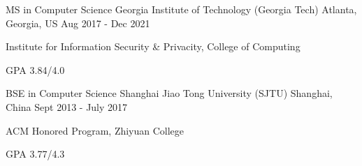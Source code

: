 


\begin{cventries}


\cventry
{MS in Computer Science} %
{Georgia Institute of Technology (Georgia Tech)} %
{Atlanta, Georgia, US} %
{Aug 2017 - Dec 2021} %
{ %
\begin{cvitems}
\item {Institute for Information Security \& Privacity, College of Computing}
\item {GPA 3.84/4.0}
\end{cvitems}
}

\cventry
{BSE in Computer Science} %
{Shanghai Jiao Tong University (SJTU)} %
{Shanghai, China} %
{Sept 2013 - July 2017} %
{ %
	\begin{cvitems}
		\item {ACM Honored Program, Zhiyuan College}
		\item {GPA 3.77/4.3}
	\end{cvitems}
}


\end{cventries}